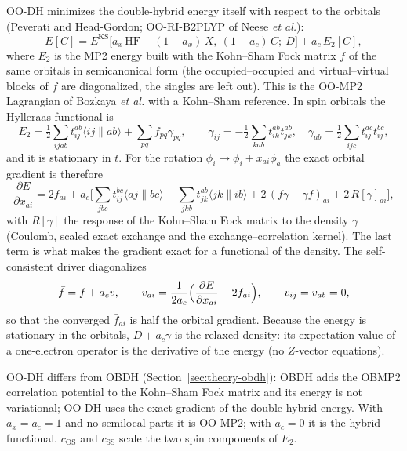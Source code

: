 OO-DH minimizes the double-hybrid energy itself with respect to the orbitals
(Peverati and Head-Gordon; OO-RI-B2PLYP of Neese \emph{et al.}):
\begin{equation}
  E[C] = E^{\mathrm{KS}}\big[a_x\,\mathrm{HF} + (1-a_x)\,X,\ (1-a_c)\,C;\ D\big]
         + a_c\,E_2[C],
\end{equation}
where $E_2$ is the MP2 energy built with the Kohn--Sham Fock matrix $f$ of the
same orbitals in semicanonical form (the occupied--occupied and
virtual--virtual blocks of $f$ are diagonalized, the singles are left out).
This is the OO-MP2 Lagrangian of Bozkaya \emph{et al.} with a Kohn--Sham
reference. In spin orbitals the Hylleraas functional is
\begin{equation}
  E_2 = \tfrac12\sum_{ijab} t_{ij}^{ab}\langle ij\|ab\rangle
        + \sum_{pq} f_{pq}\gamma_{pq},\qquad
  \gamma_{ij} = -\tfrac12\sum_{kab}t_{ik}^{ab}t_{jk}^{ab},\quad
  \gamma_{ab} = \tfrac12\sum_{ijc}t_{ij}^{ac}t_{ij}^{bc},
\end{equation}
and it is stationary in $t$. For the rotation
$\phi_i\to\phi_i+x_{ai}\phi_a$ the exact orbital gradient is therefore
\begin{equation}
  \frac{\partial E}{\partial x_{ai}} = 2f_{ai} + a_c\Big[
    \sum_{jbc}t_{ij}^{bc}\langle aj\|bc\rangle
  - \sum_{jkb}t_{jk}^{ab}\langle jk\|ib\rangle
  + 2\,(f\gamma-\gamma f)_{ai} + 2\,R[\gamma]_{ai}\Big],
\end{equation}
with $R[\gamma]$ the response of the Kohn--Sham Fock matrix to the density
$\gamma$ (Coulomb, scaled exact exchange and the exchange--correlation
kernel). The last term is what makes the gradient exact for a functional of
the density. The self-consistent driver diagonalizes
\begin{equation}
  \bar f = f + a_c v,\qquad
  v_{ai} = \frac{1}{2a_c}\Big(\frac{\partial E}{\partial x_{ai}} - 2f_{ai}\Big),
  \qquad v_{ij}=v_{ab}=0,
\end{equation}
so that the converged $\bar f_{ai}$ is half the orbital gradient. Because the
energy is stationary in the orbitals, $D + a_c\gamma$ is the relaxed density:
its expectation value of a one-electron operator is the derivative of the
energy (no $Z$-vector equations).

OO-DH differs from OBDH (Section~\ref{sec:theory-obdh}): OBDH adds the OBMP2
correlation potential to the Kohn--Sham Fock matrix and its energy is not
variational; OO-DH uses the exact gradient of the double-hybrid energy.
With $a_x=a_c=1$ and no semilocal parts it is OO-MP2; with $a_c=0$ it is the
hybrid functional. $c_{\mathrm{OS}}$ and $c_{\mathrm{SS}}$ scale the two spin
components of $E_2$.

